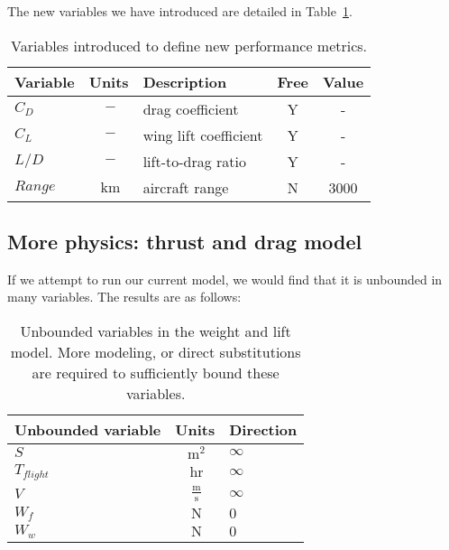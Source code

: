The new variables we have introduced are detailed in Table~\ref{tab:vars_perfMetrics}.

\begin{footnotesize}
\begin{table}
    \centering
    \begin{tabular}{ l c l c c }
        \toprule
        Variable & Units & Description & Free & Value \\
        \midrule
        $C_D$ & $~\mathrm{-}$ & drag coefficient & Y & - \\
        $C_L$ & $~\mathrm{-}$ & wing lift coefficient & Y & - \\
        $L/D$ & $~\mathrm{-}$ & lift-to-drag ratio & Y & - \\
        $Range$ & $~\mathrm{km}$ & aircraft range & N & 3000 \\
        \bottomrule
    \end{tabular}
    \caption{Variables introduced to define new performance metrics.}
    \label{tab:vars_perfMetrics}
\end{table} \end{footnotesize}

\subsection{More physics: thrust and drag model}

If we attempt to run our current model, we would find that it is unbounded in many variables.
The results are as follows:

\begin{footnotesize}
\begin{table}
    \centering
    \begin{tabular}{ l c l }
        \toprule
        Unbounded variable & Units & Direction \\
        \midrule
        $S$ & $~\mathrm{m^{2}}$ & $\infty$ \\
        $T_{flight}$ & $~\mathrm{hr}$ & $\infty$ \\
        $V$ &  $~\mathrm{\tfrac{m}{s}}$  & $\infty$ \\
        $W_f$ & $~\mathrm{N}$ & $0$ \\
        $W_w$ & $~\mathrm{N}$  & $0$ \\
        \bottomrule
    \end{tabular}
    \label{tab:WandL_unbounded}
    \caption{Unbounded variables in the weight and lift model. More modeling, or direct
    substitutions are required to
    sufficiently bound these variables.}
\end{table} \end{footnotesize}

